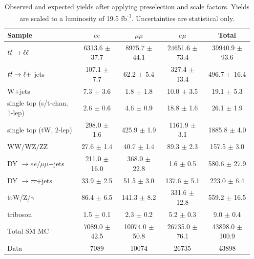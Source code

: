 \begin{table}[hbt]
\begin{center}
\caption{Observed and expected yields after applying preselection and scale
  factors. Yields are scaled to a luminosity of 19.5
  fb\textsuperscript{-1}. Uncertainties are statistical only.}
\label{tab:afb:datamcyields}
\begin{tabular}{l |  c  c  c  c}
\hline
                                        Sample   &                $ee$   &            $\mu\mu$   &              $e\mu$   &               Total  \\
\hline
                 $t\bar{t} \rightarrow \ell\ell$   &   6313.6 $\pm$ 37.7   &   8975.7 $\pm$ 44.1   &  24651.6 $\pm$ 73.4   &  39940.9 $\pm$ 93.6  \\
              $t\bar{t} \rightarrow \ell +$ jets   &     107.1 $\pm$ 7.7   &      62.2 $\pm$ 5.4   &    327.4 $\pm$ 13.4   &    496.7 $\pm$ 16.4  \\
                                        W+jets   &       7.3 $\pm$ 3.6   &       1.8 $\pm$ 1.8   &      10.0 $\pm$ 3.5   &      19.1 $\pm$ 5.3  \\
                  single top (s/t-chan, 1-lep)   &       2.6 $\pm$ 0.6   &       4.6 $\pm$ 0.9   &      18.8 $\pm$ 1.6   &      26.1 $\pm$ 1.9  \\
                        single top (tW, 2-lep)   &     298.0 $\pm$ 1.6   &     425.9 $\pm$ 1.9   &    1161.9 $\pm$ 3.1   &    1885.8 $\pm$ 4.0  \\
                                      WW/WZ/ZZ   &      27.6 $\pm$ 1.4   &      40.7 $\pm$ 1.4   &      89.3 $\pm$ 2.3   &     157.5 $\pm$ 3.0  \\
               DY $\rightarrow ee/\mu\mu$+jets   &    211.0 $\pm$ 16.0   &    368.0 $\pm$ 22.8   &       1.6 $\pm$ 0.5   &    580.6 $\pm$ 27.9  \\
                DY $\rightarrow \tau\tau$+jets   &      33.9 $\pm$ 2.5   &      51.5 $\pm$ 3.0   &     137.6 $\pm$ 5.1   &     223.0 $\pm$ 6.4  \\
                                ttW/Z/$\gamma$   &      86.4 $\pm$ 6.5   &     141.3 $\pm$ 8.2   &    331.6 $\pm$ 12.8   &    559.2 $\pm$ 16.5  \\
                                      triboson   &       1.5 $\pm$ 0.1   &       2.3 $\pm$ 0.2   &       5.2 $\pm$ 0.3   &       9.0 $\pm$ 0.4  \\
\hline
                                   Total SM MC   &   7089.0 $\pm$ 42.5   &  10074.0 $\pm$ 50.8   &  26735.0 $\pm$ 76.1   & 43898.0 $\pm$ 100.9  \\
\hline
                                          Data   &                7089   &               10074   &               26735   &               43898  \\
\hline

\end{tabular}
\end{center}
\end{table}

